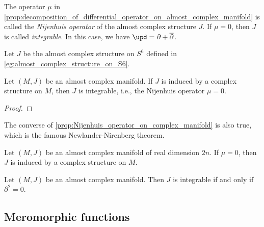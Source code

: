 \begin{definition}\label{def:Nijenhuis_operator}
	The operator \(\mu\) in \cref{prop:decomposition_of_differential_operator_on_almost_complex_manifold} is called the \emph{Nijenhuis operator} of the almost complex structure \(J\).
	If \(\mu = 0\), then \(J\) is called \emph{integrable}.
	In this case, we have \(\upd = \partial + \overline{\partial}\).
\end{definition}

\begin{example}\label{eg:Nijenhuis_operator_on_S6_for_the_almost_complex_structure_on_S6_by_octonion}
	Let \(J\) be the almost complex structure on \(S^6\) defined in \cref{eg:almost_complex_structure_on_S6}.

\end{example}

\begin{proposition}\label{prop:Nijenhuis_operator_on_complex_manifold}
	Let \((M,J)\) be an almost complex manifold.
	If \(J\) is induced by a complex structure on \(M\), then \(J\) is integrable, i.e., the Nijenhuis operator \(\mu = 0\).
\end{proposition}
\begin{proof}
\end{proof}

The converse of \cref{prop:Nijenhuis_operator_on_complex_manifold} is also true, which is the famous Newlander-Nirenberg theorem.

\begin{theorem}\label{thm:newlander_nirenberg_theorem}
	Let \((M,J)\) be an almost complex manifold of real dimension \(2n\).
	If \(\mu = 0\), then \(J\) is induced by a complex structure on \(M\).
\end{theorem}

\begin{proposition}\label{prop:integrable_almost_complex_structure_and_partial_square_zero}
	Let \((M,J)\) be an almost complex manifold.
	Then \(J\) is integrable if and only if \(\partial^2 = 0\).
\end{proposition}



\subsection{Meromorphic functions}

